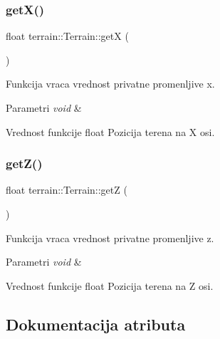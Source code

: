 \subsubsection{\texorpdfstring{get\+X()}{getX()}}
{\footnotesize\ttfamily float terrain\+::\+Terrain\+::getX (\begin{DoxyParamCaption}{ }\end{DoxyParamCaption})}



Funkcija vraca vrednost privatne promenljive x. 


\begin{DoxyParams}{Parametri}
{\em void} & \\
\hline
\end{DoxyParams}
\begin{DoxyReturn}{Vrednost funkcije}
float Pozicija terena na X osi. 
\end{DoxyReturn}
\mbox{\label{classterrain_1_1Terrain_ab348a1c250df237f2a60f59bf8797dc0}} 
\subsubsection{\texorpdfstring{get\+Z()}{getZ()}}
{\footnotesize\ttfamily float terrain\+::\+Terrain\+::getZ (\begin{DoxyParamCaption}{ }\end{DoxyParamCaption})}



Funkcija vraca vrednost privatne promenljive z. 


\begin{DoxyParams}{Parametri}
{\em void} & \\
\hline
\end{DoxyParams}
\begin{DoxyReturn}{Vrednost funkcije}
float Pozicija terena na Z osi. 
\end{DoxyReturn}


\subsection{Dokumentacija atributa}
\mbox{\label{classterrain_1_1Terrain_a48d20417020f61e62bb5d3a497c62a57}} 
